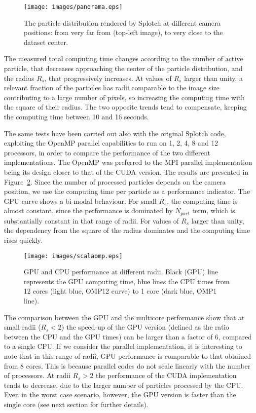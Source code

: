 \documentclass[1p]{elsarticle}
\begin{document}
\begin{figure}
\centering
\texttt{[image: images/panorama.eps]}
\caption{The particle distribution rendered by Splotch at different camera positions: from very 
far from (top-left image), to very close to the dataset center.}
\label{fig:panorama}
\end{figure}

The measured total computing time changes according
to the number of active particle, that decreases approaching the center of the particle 
distribution, and the radius $R_s$, that progressively increases. At values of 
$R_s$ larger than unity, a relevant fraction of the particles has radii comparable to the image size
contributing to a large number of pixels, so increasing the computing time 
with the square of their radius. The two opposite trends tend to compensate, keeping  
the computing time between 10 and 16 seconds.

The same tests have been carried out also with the original Splotch code, exploiting the OpenMP parallel capabilities to run on 1, 2, 4, 8 and 12 processors, in order 
to compare the performance of the two different implementations. The OpenMP was preferred to the MPI parallel implementation being its design closer to that of the CUDA version. The results are presented in Figure~\ref{fig:gpucpu}. 
Since the number of processed particles depends on
the camera position, we use the  
computing time per particle as a performance
indicator. The GPU curve shows a bi-modal behaviour. For small $R_s$,
the computing time is almost constant, since the performance is dominated
by $N_{part}$ term, which is substantially constant in that range of 
radii. For values of $R_s$ larger 
than unity, the dependency from the square of the radius dominates and the computing time 
rises quickly. 

\begin{figure}
\centering
\texttt{[image: images/scalaomp.eps]}
\caption{GPU and CPU performance at different radii. Black (GPU) line represents the GPU 
computing time, blue lines the CPU times from 12 cores (light blue, OMP12 curve) to 1 core
(dark blue, OMP1 line).}
\label{fig:gpucpu}
\end{figure}

The comparison between the GPU and the multicore performance show that 
at small radii ($R_s < 2$) the speed-up of the GPU version (defined as the ratio between the CPU and the GPU times) can be larger than a factor of 6, compared to a single CPU. If we consider the parallel implementation, it is interesting to note that in this range of radii, GPU performance is comparable to that obtained from 8 cores. This is because parallel codes do not scale linearly with the number of processors. At radii $R_s > 2$ the performance of the CUDA implementation tends to decrease, due to the larger number of particles processed by the CPU. Even in the worst case scenario, however, the GPU version is faster than the single core (see next section for further details). 
\end{document}
